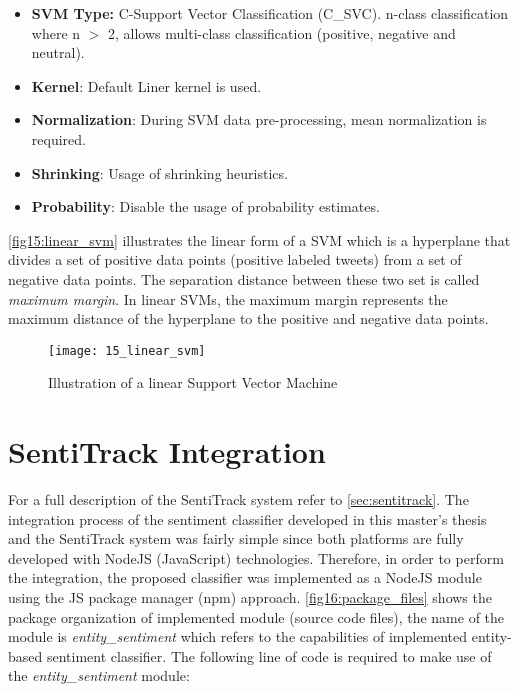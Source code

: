 \begin{itemize} 
\itemsep0em  

\item \textbf{SVM Type:} C-Support Vector Classification (C\_SVC). n-class classification where n $>$ 2, allows multi-class classification (positive, negative and neutral).

\item  \textbf{Kernel}: Default Liner kernel is used.  

\item  \textbf{Normalization}: During SVM data pre-processing, mean normalization is required.  

\item  \textbf{Shrinking}: Usage of shrinking heuristics.  

\item  \textbf{Probability}: Disable the usage of probability estimates.  

\end{itemize}

\autoref{fig15:linear_svm} illustrates the linear form of a SVM which is a hyperplane that divides a set of positive data points (positive labeled tweets) from a set of negative data points. The separation distance between these two set is called \textit{maximum margin}. In linear SVMs, the maximum margin represents the maximum distance of the hyperplane to the positive and negative data points. 

\begin{figure}[H]
    \centering
    \caption[Illustration of a linear Support Vector Machine]{Illustration of a linear Support Vector Machine{~\cite{platt1998sequential}}}
    \texttt{[image: 15\_linear\_svm]}
    \label{fig15:linear_svm}
\end{figure}


\section{SentiTrack Integration}

For a full description of the SentiTrack system refer to \autoref{sec:sentitrack}. The integration process of the sentiment classifier developed in this master's thesis and the SentiTrack system was fairly simple since both platforms are fully developed with NodeJS (JavaScript) technologies. Therefore, in order to perform the integration, the proposed classifier was implemented as a NodeJS module using the JS package manager (npm) approach. \autoref{fig16:package_files} shows the package organization of implemented module (source code files), the name of the module is \textit{entity\_sentiment} which refers to the capabilities of implemented entity-based sentiment classifier. The following line of code is required to make use of the \textit{entity\_sentiment} module:

